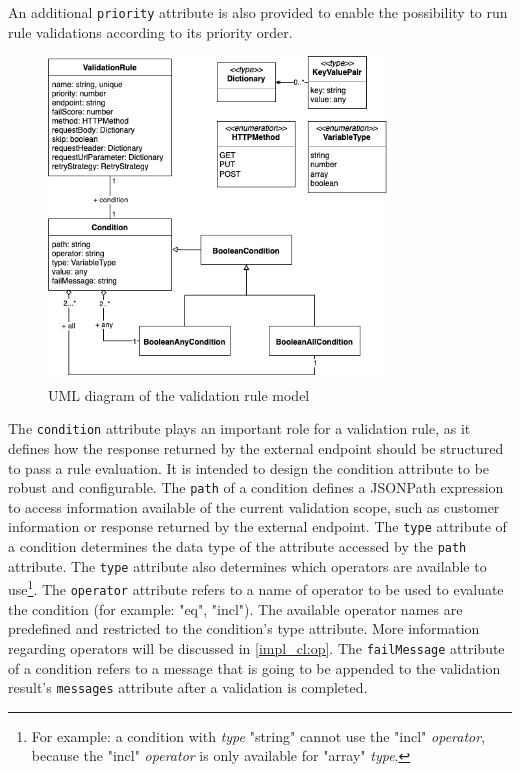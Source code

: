     An additional \verb;priority; attribute is also provided to enable the possibility to run rule validations according to its priority order.

    \begin{figure}[!ht]
      \includegraphics[width=0.8\textwidth]{diagrams/entity-validationrule.png}
      \caption{UML diagram of the validation rule model}
      \label{fig:uml_validation_rule}
    \end{figure}
    
    The \verb;condition; attribute plays an important role for a validation rule, as it defines how the response returned by the external endpoint should be structured to pass a rule evaluation. It is intended to design the condition attribute to be robust and configurable. The \verb;path; of a condition defines a JSONPath\autocite{Friesen2019} expression to access information available of the current validation scope, such as customer information or response returned by the external endpoint. The \verb;type; attribute of a condition determines the data type of the attribute accessed by the \verb;path; attribute. The \verb;type; attribute also determines which operators are available to use\footnote{For example: a condition with \emph{type} "string" cannot use the "incl" \emph{operator}, because the "incl" \emph{operator} is only available for "array" \emph{type}.}. The \verb;operator; attribute refers to a name of operator to be used to evaluate the condition (for example: "eq", "incl"). The available operator names are predefined and restricted to the condition's type attribute. More information regarding operators will be discussed in \autoref{impl_cl:op}. The \verb;failMessage; attribute of a condition refers to a message that is going to be appended to the validation result's \verb;messages; attribute after a validation is completed.

